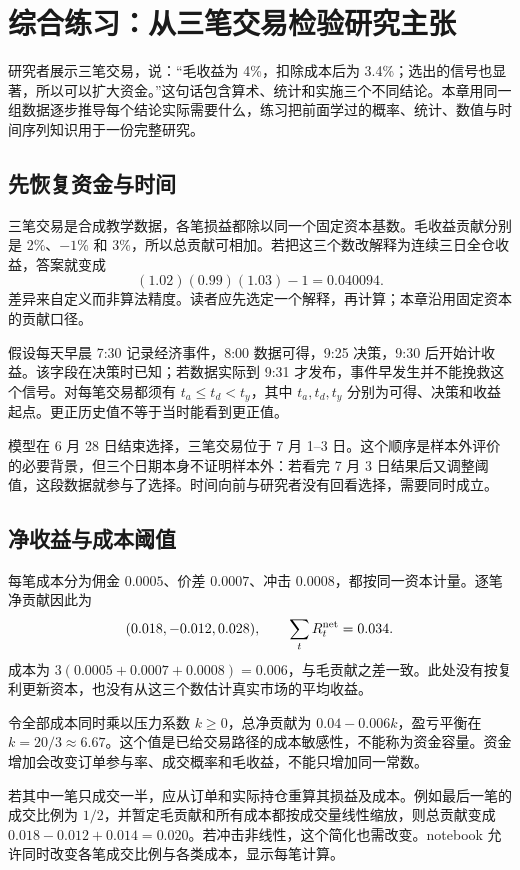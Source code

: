 \chapter{综合练习：从三笔交易检验研究主张}
\label{ch:research-audit-capstone}

研究者展示三笔交易，说：“毛收益为 4\%，扣除成本后为 3.4\%；选出的信号也显著，所以可以扩大资金。”这句话包含算术、统计和实施三个不同结论。本章用同一组数据逐步推导每个结论实际需要什么，练习把前面学过的概率、统计、数值与时间序列知识用于一份完整研究。

\section{先恢复资金与时间}
三笔交易是合成教学数据，各笔损益都除以同一个固定资本基数。毛收益贡献分别是 2\%、$-1$\% 和 3\%，所以总贡献可相加。若把这三个数改解释为连续三日全仓收益，答案就变成
\[
 (1.02)(0.99)(1.03)-1=0.040094.
\]
差异来自定义而非算法精度。读者应先选定一个解释，再计算；本章沿用固定资本的贡献口径。

假设每天早晨 7:30 记录经济事件，8:00 数据可得，9:25 决策，9:30 后开始计收益。该字段在决策时已知；若数据实际到 9:31 才发布，事件早发生并不能挽救这个信号。对每笔交易都须有 $t_a\leq t_d<t_y$，其中 $t_a,t_d,t_y$ 分别为可得、决策和收益起点。更正历史值不等于当时能看到更正值。

模型在 6 月 28 日结束选择，三笔交易位于 7 月 1--3 日。这个顺序是样本外评价的必要背景，但三个日期本身不证明样本外：若看完 7 月 3 日结果后又调整阈值，这段数据就参与了选择。时间向前与研究者没有回看选择，需要同时成立。

\section{净收益与成本阈值}
每笔成本分为佣金 $0.0005$、价差 $0.0007$、冲击 $0.0008$，都按同一资本计量。逐笔净贡献因此为
\[
 (0.018,-0.012,0.028),\qquad
 \sum_tR_t^{\rm net}=0.034.
\]
成本为 $3(0.0005+0.0007+0.0008)=0.006$，与毛贡献之差一致。此处没有按复利更新资本，也没有从这三个数估计真实市场的平均收益。

令全部成本同时乘以压力系数 $k\geq0$，总净贡献为 $0.04-0.006k$，盈亏平衡在 $k=20/3\approx6.67$。这个值是已给交易路径的成本敏感性，不能称为资金容量。资金增加会改变订单参与率、成交概率和毛收益，不能只增加同一常数。

若其中一笔只成交一半，应从订单和实际持仓重算其损益及成本。例如最后一笔的成交比例为 $1/2$，并暂定毛贡献和所有成本都按成交量线性缩放，则总贡献变成 $0.018-0.012+0.014=0.020$。若冲击非线性，这个简化也需改变。notebook 允许同时改变各笔成交比例与各类成本，显示每笔计算。

